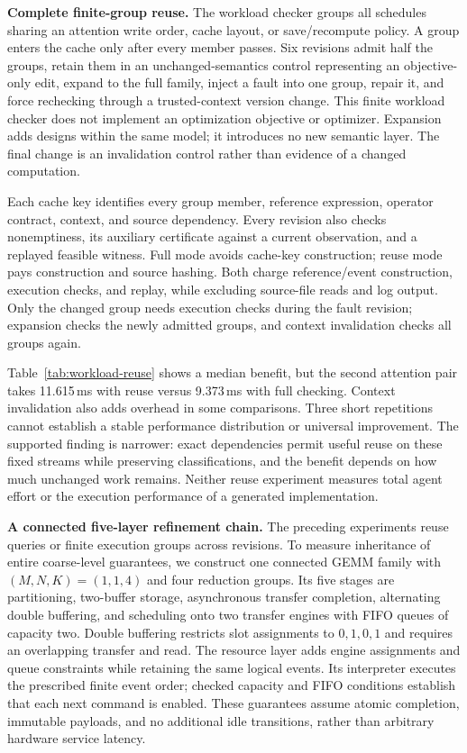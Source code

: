 \documentclass[11pt]{article}
\begin{document}
\textbf{Complete finite-group reuse.}
The workload checker groups all schedules sharing an attention write order, cache layout, or save/recompute policy. A group enters the cache only after every member passes. Six revisions admit half the groups, retain them in an unchanged-semantics control representing an objective-only edit, expand to the full family, inject a fault into one group, repair it, and force rechecking through a trusted-context version change. This finite workload checker does not implement an optimization objective or optimizer. Expansion adds designs within the same model; it introduces no new semantic layer. The final change is an invalidation control rather than evidence of a changed computation.

Each cache key identifies every group member, reference expression, operator contract, context, and source dependency. Every revision also checks nonemptiness, its auxiliary certificate against a current observation, and a replayed feasible witness. Full mode avoids cache-key construction; reuse mode pays construction and source hashing. Both charge reference/event construction, execution checks, and replay, while excluding source-file reads and log output. Only the changed group needs execution checks during the fault revision; expansion checks the newly admitted groups, and context invalidation checks all groups again.

Table~\ref{tab:workload-reuse} shows a median benefit, but the second attention pair takes 11.615\,ms with reuse versus 9.373\,ms with full checking. Context invalidation also adds overhead in some comparisons. Three short repetitions cannot establish a stable performance distribution or universal improvement. The supported finding is narrower: exact dependencies permit useful reuse on these fixed streams while preserving classifications, and the benefit depends on how much unchanged work remains. Neither reuse experiment measures total agent effort or the execution performance of a generated implementation.

\textbf{A connected five-layer refinement chain.}
The preceding experiments reuse queries or finite execution groups across revisions. To measure inheritance of entire coarse-level guarantees, we construct one connected GEMM family with $(M,N,K)=(1,1,4)$ and four reduction groups. Its five stages are partitioning, two-buffer storage, asynchronous transfer completion, alternating double buffering, and scheduling onto two transfer engines with FIFO queues of capacity two. Double buffering restricts slot assignments to $0,1,0,1$ and requires an overlapping transfer and read. The resource layer adds engine assignments and queue constraints while retaining the same logical events. Its interpreter executes the prescribed finite event order; checked capacity and FIFO conditions establish that each next command is enabled. These guarantees assume atomic completion, immutable payloads, and no additional idle transitions, rather than arbitrary hardware service latency.
\end{document}
